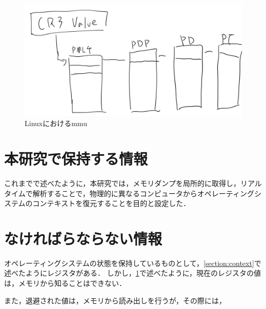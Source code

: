 \begin{figure}[htbp]
    \caption{Linuxにおけるmmu}
    \label{fig:mmu}
    \begin{center}
        \includegraphics[bb=0 0 1000 360,width=15cm]{img/tegaki/paging.png}
    \end{center}
\end{figure}


\section{本研究で保持する情報}
\label{section:info}

これまでで述べたように，本研究では，メモリダンプを局所的に取得し，リアルタイムで解析することで，物理的に異なるコンピュータからオペレーティングシステムのコンテキストを復元することを目的と設定した．

\section{なければらならない情報}
\label{section:want}

オペレーティングシステムの状態を保持しているものとして，\ref{section:context}で述べたようにレジスタがある．
しかし，\ref{section:info}で述べたように，現在のレジスタの値は，メモリから知ることはできない．

また，退避された値は，メモリから読み出しを行うが，その際には，
